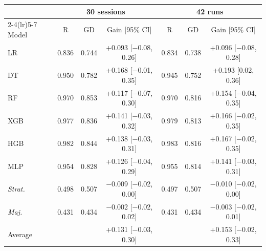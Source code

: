 \begin{tabular}{lcccccc}
\toprule
 & \multicolumn{3}{c}{30 sessions} & \multicolumn{3}{c}{42 runs} \\
\cmidrule(lr){2-4}\cmidrule(lr){5-7}
Model & R & GD & Gain [95\% CI] & R & GD & Gain [95\% CI] \\
\midrule
LR & 0.836 & 0.744 & +0.093 [$-$0.08, 0.26] & 0.834 & 0.738 & +0.096 [$-$0.08, 0.28] \\
DT & 0.950 & 0.782 & +0.168 [$-$0.01, 0.35] & 0.945 & 0.752 & +0.193 [0.02, 0.36] \\
RF & 0.970 & 0.853 & +0.117 [$-$0.07, 0.30] & 0.970 & 0.816 & +0.154 [$-$0.04, 0.35] \\
XGB & 0.977 & 0.836 & +0.141 [$-$0.03, 0.32] & 0.979 & 0.813 & +0.166 [$-$0.02, 0.35] \\
HGB & 0.982 & 0.844 & +0.138 [$-$0.03, 0.31] & 0.983 & 0.816 & +0.167 [$-$0.02, 0.35] \\
MLP & 0.954 & 0.828 & +0.126 [$-$0.04, 0.29] & 0.955 & 0.814 & +0.141 [$-$0.03, 0.31] \\
\textit{Strat.} & 0.498 & 0.507 & $-$0.009 [$-$0.02, 0.00] & 0.497 & 0.507 & $-$0.010 [$-$0.02, 0.00] \\
\textit{Maj.} & 0.431 & 0.434 & $-$0.002 [$-$0.02, 0.02] & 0.431 & 0.434 & $-$0.003 [$-$0.02, 0.01] \\
\midrule
Average &  &  & +0.131 [$-$0.03, 0.30] &  &  & +0.153 [$-$0.02, 0.33] \\
\bottomrule
\end{tabular}
